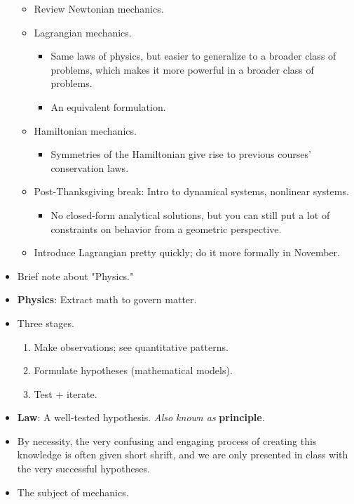 \documentclass[../notes.tex]{subfiles}
\begin{document}
\begin{itemize}
    \begin{itemize}
        \item Review Newtonian mechanics.
        \item Lagrangian mechanics.
        \begin{itemize}
            \item Same laws of physics, but easier to generalize to a broader class of problems, which makes it more powerful in a broader class of problems.
            \item An equivalent formulation.
        \end{itemize}
        \item Hamiltonian mechanics.
        \begin{itemize}
            \item Symmetries of the Hamiltonian give rise to previous courses' conservation laws.
        \end{itemize}
        \item Post-Thanksgiving break: Intro to dynamical systems, nonlinear systems.
        \begin{itemize}
            \item No closed-form analytical solutions, but you can still put a lot of constraints on behavior from a geometric perspective.
        \end{itemize}
        \item Introduce Lagrangian pretty quickly; do it more formally in November.
    \end{itemize}
    \item Brief note about "Physics."
    \item \textbf{Physics}: Extract math to govern matter.
    \item Three stages.
    \begin{enumerate}
        \item Make observations; see quantitative patterns.
        \item Formulate hypotheses (mathematical models).
        \item Test + iterate.
    \end{enumerate}
    \item \textbf{Law}: A well-tested hypothesis. \emph{Also known as} \textbf{principle}.
    \item By necessity, the very confusing and engaging process of creating this knowledge is often given short shrift, and we are only presented in class with the very successful hypotheses.
    \item The subject of mechanics.

\end{itemize}
\end{document}
